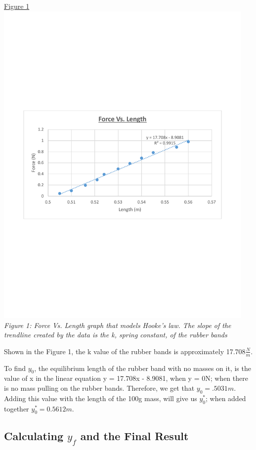\documentclass[aps,letterpaper,11pt]{revtex4}
\begin{document}
\begin{center}
\underline{Figure 1}\\
\vspace{-50mm}
\includegraphics[width=5in]{P6Lab10Data.pdf}\\
\vspace{-50mm}
\textit{Figure 1: Force Vs. Length graph that models Hooke's law. The slope of the trendline created by the data is the k, spring constant, of the rubber bands}
\end{center}

Shown in the Figure 1, the k value of the rubber bands is approximately 17.708$\frac{N}{m}$.

To find $y_0$, the equilibrium length of the rubber band with no masses on it, is the value of x in the linear equation y = 17.708x - 8.9081, when y = 0N; when there is no mass pulling on the rubber bands. Therefore, we get that $y_0 = .5031m$. Adding this value with the length of the 100g mass, will give us $y_0^*$; when added together $y_0^* = 0.5612m$. 

\subsection{Calculating $y_f$ and the Final Result}
\end{document}
